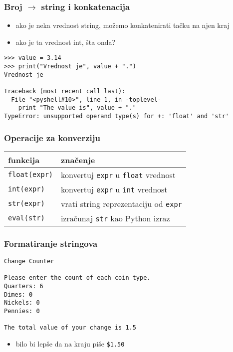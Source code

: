 \documentclass[utf8,compress,aspectratio=169]{beamer}
\begin{document}
\begin{frame}[fragile,shrink=6]
  \frametitle{Broj $\rightarrow$ string i konkatenacija}
  \begin{itemize}
    \item ako je neka vrednost string, možemo konkatenirati tačku na njen kraj
    \item ako je ta vrednost int, šta onda?
  \end{itemize}
\begin{verbatim}
>>> value = 3.14
>>> print("Vrednost je", value + ".")
Vrednost je

Traceback (most recent call last):
  File "<pyshell#10>", line 1, in -toplevel-
    print "The value is", value + "."
TypeError: unsupported operand type(s) for +: 'float' and 'str'
\end{verbatim}
\end{frame}

\begin{frame}[fragile]
  \frametitle{Operacije za konverziju}
\begin{center}
\begin{tabular}{l|l}
\textbf{funkcija} & \textbf{značenje} \\ \hline
\texttt{float(expr)} & konvertuj \texttt{expr} u \texttt{float} vrednost \\
\texttt{int(expr)} & konvertuj \texttt{expr} u \texttt{int} vrednost \\
\texttt{str(expr)} & vrati string reprezentaciju od \texttt{expr} \\
\texttt{eval(str)} & izračunaj \texttt{str} kao Python izraz
\end{tabular}
\end{center}
\end{frame}

\begin{frame}[fragile]
  \frametitle{Formatiranje stringova}
\begin{verbatim}
Change Counter

Please enter the count of each coin type.
Quarters: 6
Dimes: 0
Nickels: 0
Pennies: 0

The total value of your change is 1.5
\end{verbatim}
  \begin{itemize}
    \item bilo bi lepše da na kraju piše \texttt{\$1.50}
  \end{itemize}
\end{frame}
\end{document}
